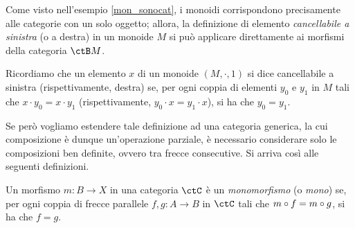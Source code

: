 Come visto nell'esempio \ref{mon_sonocat}, i monoidi corrispondono precisamente alle categorie con un solo oggetto; allora,
la definizione di elemento \emph{cancellabile a sinistra} (o a destra) in un monoide $M$ si può applicare direttamente ai morfismi della categoria $\ctB M$.

Ricordiamo che un elemento \(x\) di un monoide \((M, \cdot, 1)\) si dice cancellabile a sinistra (rispettivamente, destra) se,
per ogni coppia di elementi \(y_0\) e \(y_1\) in \(M\) tali che \(x \cdot y_0 = x \cdot y_1\) (rispettivamente, \(y_0 \cdot x = y_1 \cdot x\)), si ha che \(y_0 = y_1\).

Se però vogliamo estendere tale definizione ad una categoria generica,
la cui composizione è dunque un'operazione parziale,
è necessario considerare solo le composizioni ben definite, ovvero tra frecce consecutive.
Si arriva così alle seguenti definizioni.

\begin{definition}[Monomorfismo]\label{def_Mono}
	Un morfismo \(m \colon B \to X\) in una categoria \(\ctC\) è un \emph{monomorfismo} (o \emph{mono}) se,
	per ogni coppia di frecce parallele \(f, g \colon A \to B\) in \(\ctC\) tali che \(m \circ f = m \circ g\), si ha che \(f = g\).
\end{definition}


